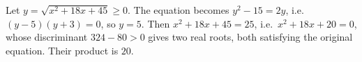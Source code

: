 Let $y=\sqrt{x^2+18x+45}\ge0$. The equation becomes $y^2-15=2y$, i.e.\ $(y-5)(y+3)=0$, so $y=5$. Then $x^2+18x+45=25$, i.e.\ $x^2+18x+20=0$, whose discriminant $324-80>0$ gives two real roots, both satisfying the original equation. Their product is $\boxed{20}$.
